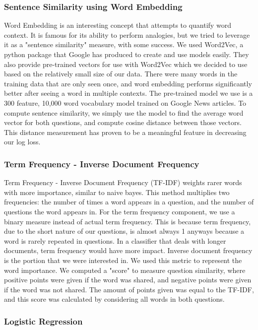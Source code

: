 \documentclass{article}
\begin{document}
\subsubsection{Sentence Similarity using Word Embedding}

Word Embedding is an interesting concept that attempts to quantify word context.
It is famous for its ability to perform analogies, but we tried to leverage it
as a "sentence similarity" measure, with some success. We used Word2Vec, a
python package that Google has produced to create and use models easily. They
also provide pre-trained vectors for use with Word2Vec which we decided to use
based on the relatively small size of our data. There were many words in the
training data that are only seen once, and word embedding performs significantly
better after seeing a word in multiple contexts. The pre-trained model we use is
a 300 feature, 10,000 word vocabulary model trained on Google News articles. To
compute sentence similarity, we simply use the model to find the average word
vector for both questions, and compute cosine distance between those vectors.
This distance measurement has proven to be a meaningful feature in decreasing
our log loss.

\subsubsection{Term Frequency - Inverse Document Frequency}

Term Frequency - Inverse Document Frequency (TF-IDF) weights rarer words with
more importance, similar to naive bayes. This method multiplies two frequencies:
the number of times a word appears in a question, and the number of questions
the word appears in. For the term frequency component, we use a binary measure
instead of actual term frequency. This is because term frequency, due to the
short nature of our questions, is almost always 1 anyways because a word is
rarely repeated in questions. In a classifier that deals with longer documents,
term frequency would have more impact. Inverse document frequency is the portion
that we were interested in. We used this metric to represent the word importance.
We computed a "score" to measure question similarity, where positive points were
given if the word was shared, and negative points were given if the word was not
shared. The amount of points given was equal to the TF-IDF, and this score was
calculated by considering all words in both questions.

\subsubsection{Logistic Regression}
\end{document}
